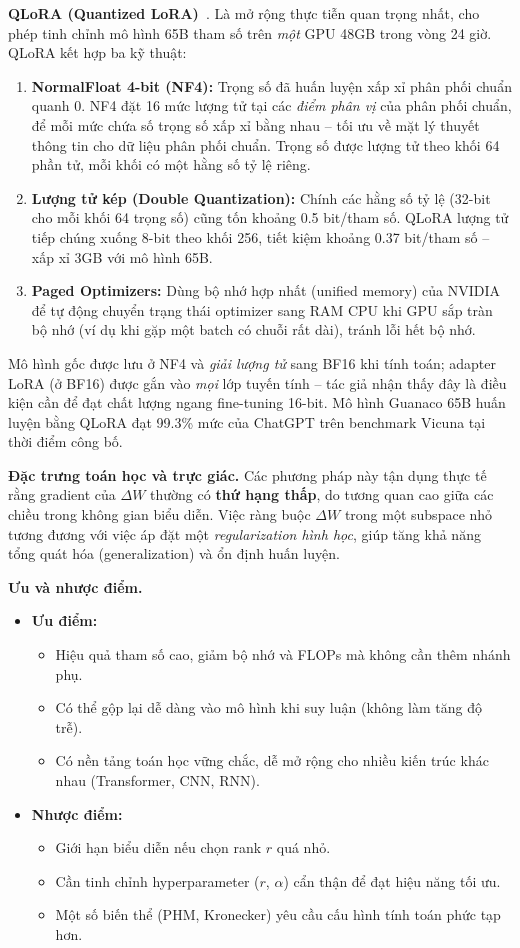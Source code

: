 \textbf{QLoRA (Quantized LoRA)}~\cite{dettmers2023qlora}.
Là mở rộng thực tiễn quan trọng nhất, cho phép tinh chỉnh mô hình 65B tham số trên \emph{một} GPU 48GB trong vòng 24 giờ. QLoRA kết hợp ba kỹ thuật:
\begin{enumerate}
	\item \textbf{NormalFloat 4-bit (NF4):} Trọng số đã huấn luyện xấp xỉ phân phối chuẩn quanh 0. NF4 đặt 16 mức lượng tử tại các \emph{điểm phân vị} của phân phối chuẩn, để mỗi mức chứa số trọng số xấp xỉ bằng nhau -- tối ưu về mặt lý thuyết thông tin cho dữ liệu phân phối chuẩn. Trọng số được lượng tử theo khối 64 phần tử, mỗi khối có một hằng số tỷ lệ riêng.
	\item \textbf{Lượng tử kép (Double Quantization):} Chính các hằng số tỷ lệ (32-bit cho mỗi khối 64 trọng số) cũng tốn khoảng 0.5 bit/tham số. QLoRA lượng tử tiếp chúng xuống 8-bit theo khối 256, tiết kiệm khoảng 0.37 bit/tham số -- xấp xỉ 3GB với mô hình 65B.
	\item \textbf{Paged Optimizers:} Dùng bộ nhớ hợp nhất (unified memory) của NVIDIA để tự động chuyển trạng thái optimizer sang RAM CPU khi GPU sắp tràn bộ nhớ (ví dụ khi gặp một batch có chuỗi rất dài), tránh lỗi hết bộ nhớ.
\end{enumerate}
Mô hình gốc được lưu ở NF4 và \emph{giải lượng tử} sang BF16 khi tính toán; adapter LoRA (ở BF16) được gắn vào \emph{mọi} lớp tuyến tính -- tác giả nhận thấy đây là điều kiện cần để đạt chất lượng ngang fine-tuning 16-bit. Mô hình Guanaco 65B huấn luyện bằng QLoRA đạt 99.3\% mức của ChatGPT trên benchmark Vicuna tại thời điểm công bố.

\textbf{Đặc trưng toán học và trực giác.}  
Các phương pháp này tận dụng thực tế rằng gradient của $\Delta W$ thường có \textbf{thứ hạng thấp}, do tương quan cao giữa các chiều trong không gian biểu diễn.  
Việc ràng buộc $\Delta W$ trong một subspace nhỏ tương đương với việc áp đặt một \textit{regularization hình học}, giúp tăng khả năng tổng quát hóa (generalization) và ổn định huấn luyện.

\textbf{Ưu và nhược điểm.}
\begin{itemize}
	\item \textbf{Ưu điểm:}
	\begin{itemize}
		\item Hiệu quả tham số cao, giảm bộ nhớ và FLOPs mà không cần thêm nhánh phụ.
		\item Có thể gộp lại dễ dàng vào mô hình khi suy luận (không làm tăng độ trễ).  
		\item Có nền tảng toán học vững chắc, dễ mở rộng cho nhiều kiến trúc khác nhau (Transformer, CNN, RNN).  
	\end{itemize}
	\item \textbf{Nhược điểm:}
	\begin{itemize}
		\item Giới hạn biểu diễn nếu chọn rank $r$ quá nhỏ.  
		\item Cần tinh chỉnh hyperparameter ($r$, $\alpha$) cẩn thận để đạt hiệu năng tối ưu.  
		\item Một số biến thể (PHM, Kronecker) yêu cầu cấu hình tính toán phức tạp hơn.  
	\end{itemize}
\end{itemize}

